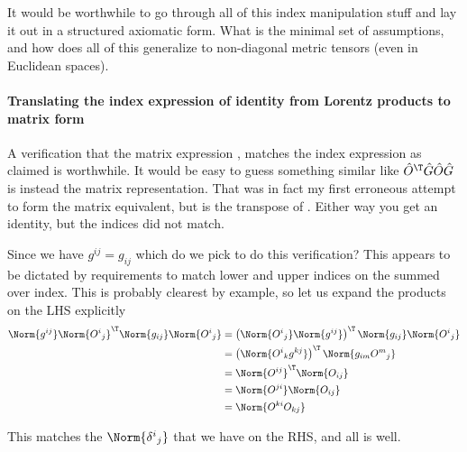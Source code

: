 It would be worthwhile to go through all of this index manipulation stuff and lay it out in a structured axiomatic form.  What is the minimal set of assumptions, and how does all of this generalize to non-diagonal metric tensors (even in Euclidean spaces).
%
\paragraph{Translating the index expression of identity from Lorentz products to matrix form}
%
A verification that the matrix expression , matches the index expression  as claimed is worthwhile.  It would be easy to guess something similar like \(\hat{O}^\T \hat{G} \hat{O} \hat{G}\) is instead the matrix representation.  That was in fact my first erroneous attempt to form the matrix equivalent, but is the transpose of .  Either way you get an identity, but the indices did not match.

Since we have \(g^{i j} = g_{i j}\) which do we pick to do this verification?  This appears to be dictated by requirements to match lower and upper indices on the summed over index.  This is probably clearest by example, so let us expand the products on the LHS explicitly
%
\begin{equation}\label{eqn:relativisticElectrodynamicsL11b:1500}
\begin{aligned}
\Norm{ g^{i j} }
\Norm{ {O^{i}}_j } ^\T
\Norm{ g_{i j} }
\Norm{ {O^{i}}_j }
&=
\left( \Norm{ {O^{i}}_j }
\Norm{ g^{i j} } \right) ^\T
\Norm{ g_{i j} }
\Norm{ {O^{i}}_j }  \\
&=
\left( \Norm{ {O^{i}}_k g^{k j} } \right) ^\T
\Norm{ g_{i m} {O^{m}}_j }  \\
&=
\Norm{ O^{i j} } ^\T
\Norm{ O_{i j} }  \\
&=
\Norm{ O^{j i} }
\Norm{ O_{i j} }  \\
&=
\Norm{ O^{k i} O_{k j} }  \\
\end{aligned}
\end{equation}

This matches the \(\Norm{{\delta^i}_j}\) that we have on the RHS, and all is well.
